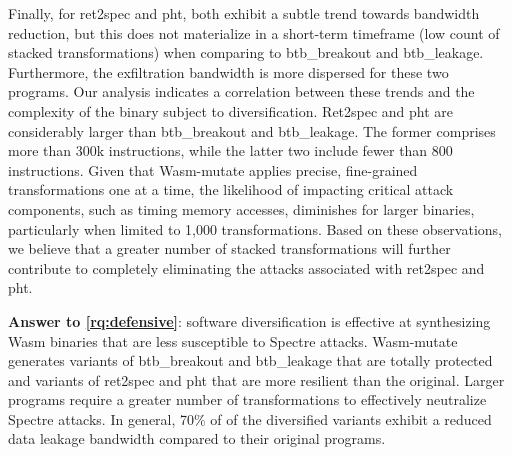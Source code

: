 \documentclass[sigplan,screen]{acmart}
\newcommand*\badge[1]{ \colorbox{red}{\color{white}#1}}
\newcommand{\tool}{Wasm-mutate\xspace}
\newcommand{\wasm}{Wasm\xspace}
\newcommand{\todo}[1]{%
\refstepcounter{todo}
\noindent\textbf{\badge{TODO}} {\color{red}#1}
\addcontentsline{td}{todo}
{\color{red}\thesection.\thetodo\xspace #1}}
\begin{document}
Finally, for ret2spec and pht, both exhibit a subtle trend towards bandwidth reduction, but this does not materialize in a short-term timeframe (low count of stacked transformations) when comparing to btb\_breakout and btb\_leakage.
Furthermore,  the exfiltration bandwidth is more dispersed for these two programs.
Our analysis indicates a correlation between these trends and the complexity of the binary subject to diversification.
Ret2spec and pht are considerably larger than btb\_breakout and btb\_leakage.
The former comprises more than 300k instructions, while the latter two include fewer than 800 instructions.
Given that \tool applies precise, fine-grained transformations one at a time, the likelihood of impacting critical attack components, such as timing memory accesses, diminishes for larger binaries, particularly when limited to 1,000 transformations.
Based on these observations, we believe that a greater number of stacked transformations will further contribute to completely eliminating the attacks associated with ret2spec and pht.





\begin{tcolorbox}[boxrule=1pt,arc=.3em,boxsep=-1.3mm]
  \textbf{Answer to \ref{rq:defensive}}:   software diversification is effective at synthesizing \wasm binaries that are less susceptible  to Spectre attacks.  
  \tool generates variants of btb\_breakout and btb\_leakage that are totally protected and variants of ret2spec and pht that are more resilient than the original.
Larger programs require a greater number of transformations to effectively neutralize Spectre attacks.
    In general, 70\% of of the diversified variants exhibit a reduced data leakage bandwidth compared to their original programs.
\end{tcolorbox}


\end{document}
